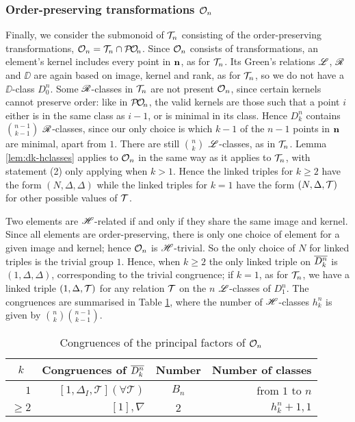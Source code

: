 \subsubsection{Order-preserving transformations $\mathcal{O}_n$}
\label{sec:princfact-on}
Finally, we consider the submonoid of $\mathcal{T}_n$ consisting of the order-preserving
transformations, $\mathcal{O}_n = \mathcal{T}_n \cap \mathcal{P\!O\!}_n$.  Since $\mathcal{O}_n$ consists of
transformations, an element's kernel includes every point in $\mathbf{n}$, as for
$\mathcal{T}_n$.  Its Green's relations $\mathrel{\mathscr{L}}$, $\mathrel{\mathscr{R}}$ and $\DD$ are again based on image,
kernel and rank, as for $\mathcal{T}_n$, so we do not have a $\DD$-class $D_0^n$.  Some
$\mathrel{\mathscr{R}}$-classes in $\mathcal{T}_n$ are not present $\mathcal{O}_n$, since certain kernels cannot
preserve order: like in $\mathcal{P\!O\!}_n$, the valid kernels are those such that a point
$i$ either is in the same class as $i-1$, or is minimal in its class.  Hence
$D_k^n$ contains $\binom{n-1}{k-1}$ $\mathrel{\mathscr{R}}$-classes, since our only choice is
which $k-1$ of the $n-1$ points in $\mathbf{n}$ are minimal, apart from $1$.  There are
still $\binom{n}{k}$ $\mathrel{\mathscr{L}}$-classes, as in $\mathcal{T}_n$.  Lemma \ref{lem:dk-hclasses}
applies to $\mathcal{O}_n$ in the same way as it applies to $\mathcal{T}_n$, with statement (2)
only applying when $k > 1$.  Hence the linked triples for $k \geq 2$ have the
form $(N, \Delta, \Delta)$ while the linked triples for $k=1$ have the form
$(N, \Delta, \mathcal{T})$ for other possible values of $\mathcal{T}$.

Two elements are $\mathrel{\mathscr{H}}$-related if and only if they share the same image and
kernel.  Since all elements are order-preserving, there is only one choice of
element for a given image and kernel; hence $\mathcal{O}_n$ is $\mathrel{\mathscr{H}}$-trivial.  So the
only choice of $N$ for linked triples is the trivial group $1$.  Hence, when
$k \geq 2$ the only linked triple on $\overline{D_k^n}$ is $(1, \Delta, \Delta)$,
corresponding to the trivial congruence; if $k = 1$, as for $\mathcal{T}_n$, we have a
linked triple $(1, \Delta, \mathcal{T})$ for any relation $\mathcal{T}$ on the $n$ $\mathrel{\mathscr{L}}$-classes
of $D_1^n$.  The congruences are summarised in Table \ref{tab:dkstar-congs-on},
where the number of $\mathrel{\mathscr{H}}$-classes $h_k^n$ is given by
$\binom{n}{k} \binom{n-1}{k-1}$.

\begin{table}[h]
  \centering
  \renewcommand{\arraystretch}{1.3}
  \begin{tabular}{| r | r | c | r |}
    \hline
    \multicolumn{1}{|c|}{$k$} & \multicolumn{1}{c|}{\textbf{Congruences of $\overline{D_k^n}$}} & \textbf{Number} & \multicolumn{1}{c|}{\textbf{Number of classes}} \\
    \hline
    $1$ & $[1, \Delta_I, \mathcal{T}] (\forall \mathcal{T})$ & $B_n$ & from $1$ to $n$ \\
    $\geq 2$
    & $[1], \nabla$
    & $2$
    & $h_k^n + 1, 1$ \\
    \hline
  \end{tabular}
  \caption{Congruences of the principal factors of $\mathcal{O}_n$}
  \label{tab:dkstar-congs-on}
\end{table}

